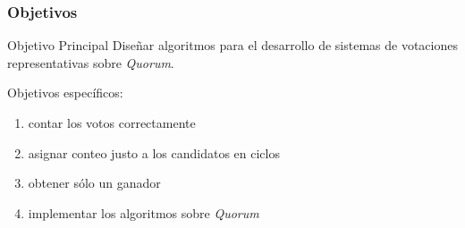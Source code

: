 \documentclass{beamer}
\begin{document}
\newcommand{\countsectionname}{contar los votos correctamente}
\newcommand{\cyclecountsectionname}{asignar conteo justo a los candidatos en ciclos}
\newcommand{\onewinneronlysectionname}{obtener s\'olo un ganador}
\newcommand{\quorumimplementationsectionname}{implementar los algoritmos sobre {\it Quorum}}

\begin{frame}
    \frametitle{Objetivos}

    \begin{alertblock}{Objetivo Principal}
        Dise\~nar algoritmos para el desarrollo de sistemas de votaciones representativas sobre \textit{Quorum}.
    \end{alertblock}

    \pause

    Objetivos espec\'ificos:

    \pause

    \begin{enumerate}[<+->]
        \item \countsectionname
        \item \cyclecountsectionname
        \item \onewinneronlysectionname
        \item \quorumimplementationsectionname
    \end{enumerate}
\end{frame}


\end{document}
